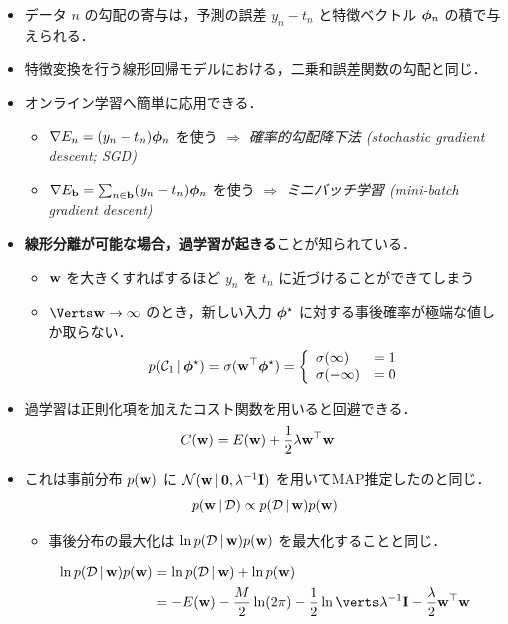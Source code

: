 \begin{itemize}
  \item データ $n$ の勾配の寄与は，予測の誤差 $y_n - t_n$ と特徴ベクトル $\boldsymbol{\phi}_n$ の積で与えられる．
  \item 特徴変換を行う線形回帰モデルにおける，二乗和誤差関数の勾配と同じ．
  \item オンライン学習へ簡単に応用できる．
  \begin{itemize}
    \item $\nabla E_n = (y_n - t_n) \boldsymbol{\phi}_n$ を使う $\Rightarrow$ \emph{確率的勾配降下法 (stochastic gradient descent; SGD)}
    \item $\nabla E_{\mathbf{b}} = \sum_{n \in {\mathbf{b}}} (y_n - t_n) \boldsymbol{\phi}_n$ を使う $\Rightarrow$ \emph{ミニバッチ学習 (mini-batch gradient descent)}
  \end{itemize}
  \item \textbf{線形分離が可能な場合，過学習が起きる}ことが知られている．
  \begin{itemize}
    \item ${\mathbf{w}}$ を大きくすればするほど $y_n$ を $t_n$ に近づけることができてしまう
    \item $\norm{\vw} \to \infty$ のとき，新しい入力 $\boldsymbol{\phi}^\star$ に対する事後確率が極端な値しか取らない．
    \[
      p({\mathcal{C}}_1 \,|\, \boldsymbol{\phi}^\star) = \sigma({\mathbf{w}}^\top\boldsymbol{\phi}^\star) = \left\{ \begin{array}{ll}
        \sigma(\infty) & = 1\\
        \sigma(-\infty) & = 0
      \end{array}\right.
    \]
  \end{itemize}
  \item 過学習は正則化項を加えたコスト関数を用いると回避できる．
  \begin{align*}
    C({\mathbf{w}})        &= E({\mathbf{w}}) + \frac{1}{2} \lambda {\mathbf{w}}^\top{\mathbf{w}}
  \end{align*}
  \item これは事前分布 $p({\mathbf{w}})$ に ${\mathcal{N}}({\mathbf{w}} \,|\, \mathbf{0}, \lambda^{-1} {\mathbf{I}})$ を用いてMAP推定したのと同じ．
  \[
    p({\mathbf{w}} \,|\, {\mathcal{D}}) \propto p({\mathcal{D}} \,|\, {\mathbf{w}}) p({\mathbf{w}})
  \]
  \begin{itemize}
    \item 事後分布の最大化は $\ln p({\mathcal{D}} \,|\, {\mathbf{w}}) p({\mathbf{w}})$ を最大化することと同じ．
  \end{itemize}
  \begin{align*}
    \ln p(\cD \given \vw) p(\vw)
    & = \ln p(\cD \given \vw) + \ln p(\vw) \\
    & = -E(\vw) - \frac{M}{2}\ln(2\pi) - \frac{1}{2}\ln\abs{\lambda\inv\vI} -\frac{\lambda}{2} \vw\trans\vw 
  \end{align*}
\end{itemize}

